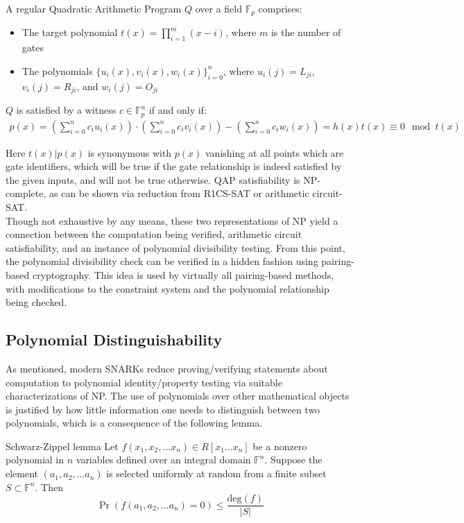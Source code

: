 \begin{definition}
A regular Quadratic Arithmetic Program $Q$ over a field $\mathbb{F}_p$ comprises:
\begin{itemize}
    \item The target polynomial $t(x) = \prod_{i=1}^m (x - i)$, where $m$ is the number of gates
    \item The polynomials $\{u_i(x), v_i(x), w_i(x)\}_{i=0}^n$, where $u_i(j) = L_{ji}$, $v_i(j) = R_{ji}$, and $w_i(j) = O_{ji}$
\end{itemize}

$Q$ is satisfied by a witness $c \in \mathbb{F}_p^n$ if and only if:
\begin{align}
p(x) = \left(\sum_{i=0}^n c_i u_i(x)\right) \cdot \left(\sum_{i=0}^n c_i v_i(x)\right) - \left(\sum_{i=0}^n c_i w_i(x)\right) = h(x)t(x) \equiv 0 \mod t(x)
\end{align}
\end{definition}

\noindent Here $t(x) | p(x)$ is synonymous with $p(x)$ vanishing at all points which are gate identifiers, which will be true if the gate relationship is indeed satisfied by the given inputs, and will not be true otherwise. QAP satisfiability is NP-complete, as can be shown via reduction from R1CS-SAT or arithmetic circuit-SAT.\\

\noindent Though not exhaustive by any means, these two representations of NP yield a connection between the computation being verified, arithmetic circuit satisfiability, and an instance of polynomial divisibility testing. From this point, the polynomial divisibility check can be verified in a hidden fashion using pairing-based cryptography. This idea is used by virtually all pairing-based methods, with modifications to the constraint system and the polynomial relationship being checked.

\subsection{Polynomial Distinguishability}
\noindent As mentioned, modern SNARKs reduce proving/verifying statements about computation to polynomial identity/property testing via suitable characterizations of NP. The use of polynomials over other mathematical objects is justified by how little information one needs to distinguish between two polynomials, which is a consequence of the following lemma.

\begin{lemma}{Schwarz-Zippel lemma}
\noindent Let $f(x_1, x_2, \dots x_n) \in R[x_1 \dots x_n]$ be a nonzero polynomial in $n$ variables defined over an integral domain $\mathbb{F}^{n}$. Suppose the element $(a_1, a_2, \dots a_n)$ is selected uniformly at random from a finite subset $S \subset \mathbb{F}^n$. Then 
$$
    \Pr(f(a_1, a_2, \dots a_n) = 0) \le \frac{\text{deg}(f)}{|S|}
$$
\end{lemma}


